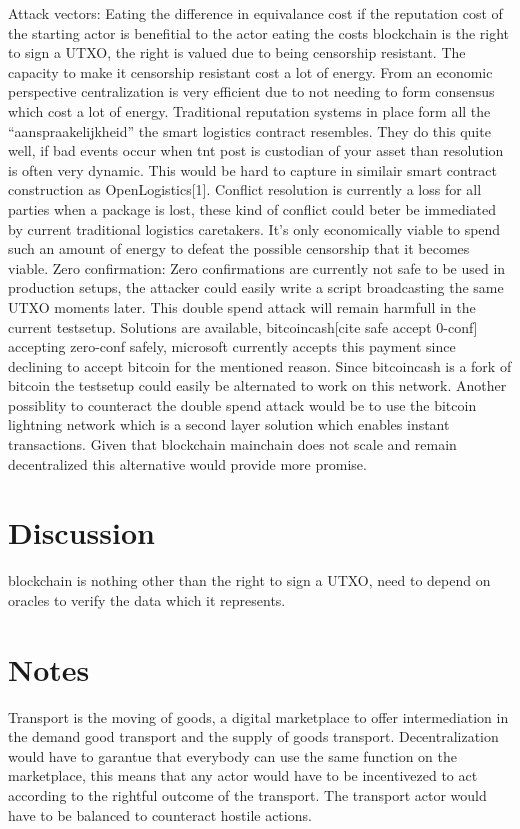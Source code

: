 \documentclass[Nomencl]{DylanMaster}
\begin{document}
Attack vectors:
Eating the difference in equivalance cost if the reputation cost of the starting actor is benefitial to the actor eating the costs
blockchain is the right to sign a UTXO, the right is valued due to being censorship resistant. The capacity to make it censorship resistant cost a lot of energy. From an economic perspective centralization is very efficient due to not needing to form consensus which cost a lot of energy. Traditional reputation systems in place form all the “aanspraakelijkheid” the smart logistics contract resembles. They do this quite well, if bad events occur  when tnt post is custodian of your asset than resolution is often very dynamic. This would be hard to capture in similair smart contract construction as OpenLogistics[1]. Conflict resolution is currently a loss for all parties when a package is lost, these kind of conflict could beter be immediated by current traditional logistics caretakers.
 It’s only economically viable to spend such an amount of energy to defeat the possible censorship that it becomes viable.
Zero confirmation:
Zero confirmations are currently not safe to be used in production setups, the attacker could easily write a script broadcasting the same UTXO moments later. This double spend attack will remain harmfull in the current testsetup. Solutions are available, bitcoincash[cite safe accept 0-conf] accepting zero-conf safely, microsoft currently accepts this payment since declining to accept bitcoin for the mentioned reason. Since bitcoincash is a fork of bitcoin the testsetup could easily be alternated to work on this network. Another possiblity to counteract the double spend attack would be to use the bitcoin lightning network which is a second layer solution which enables instant transactions. Given that blockchain mainchain does not scale and remain decentralized this alternative would provide more promise.

\section{Discussion}

blockchain is nothing other than the right to sign a UTXO, need to depend on oracles to verify the data which it represents.

\section{Notes}

Transport is the moving of goods, a digital marketplace to offer intermediation in the demand good transport and the supply of goods transport. Decentralization would have to garantue that everybody can use the same function on the marketplace, this means that any actor would have to be incentivezed to act according to the rightful outcome of the transport. The transport actor would have to be balanced to counteract hostile actions.
\end{document}
